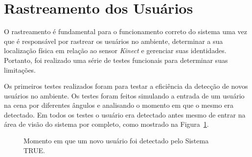 \section{Rastreamento dos Usuários}

	O rastreamento é fundamental para o funcionamento correto do sistema uma vez que é responsável por rastrear os usuários no ambiente, determinar a sua localização física em relação ao sensor \textit{Kinect} e gerenciar suas identidades. Portanto, foi realizado uma série de testes funcionais para determinar suas limitações.

	Os primeiros testes realizados foram para testar a eficiência da detecção de novos usuários no ambiente. Os testes foram feitos simulando a entrada de um usuário na cena por diferentes ângulos e analisando o momento em que o mesmo era detectado. Em todos os testes o usuário era detectado antes mesmo de entrar na área de visão do sistema por completo, como mostrado na Figura~\ref{fig:testes_deteccao}.
	
		\begin{figure}[htb]
			\begin{center}
			\end{center}
			\caption{Momento em que um novo usuário foi detectado pelo Sistema TRUE.}
			\label{fig:testes_deteccao}
		\end{figure}

